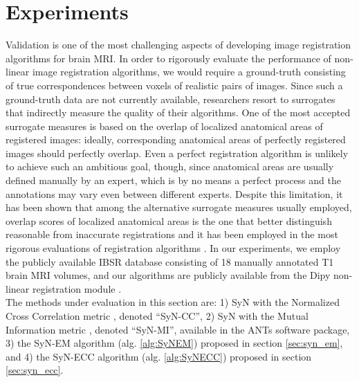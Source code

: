 \section{Experiments}
Validation is one of the most challenging aspects of developing image registration algorithms for brain MRI. In order to rigorously evaluate the performance of non-linear
image registration algorithms, we would require a ground-truth consisting of true correspondences between voxels of realistic pairs of images. Since such a ground-truth data are not currently available, researchers resort to surrogates that indirectly measure the quality of their algorithms. One of the most accepted surrogate measures is based
on the overlap of localized anatomical areas of registered images: ideally, corresponding anatomical areas of perfectly registered images should perfectly
overlap. Even a perfect registration algorithm is unlikely to achieve such an ambitious goal, though, since anatomical areas are usually defined manually by an expert, which is
by no means a perfect process and the annotations may vary even between different experts. Despite this limitation, it has been shown that among the alternative surrogate measures
usually employed, overlap scores of localized anatomical areas is the one that better distinguish reasonable from inaccurate registrations \citep{Rohlfing2012} and it has been employed in the most rigorous evaluations of registration algorithms \citep{Klein2009, Klein2010, Rohlfing2012}. In our experiments, we employ the publicly available IBSR database consisting of 18 manually annotated T1 brain MRI volumes, and our algorithms are publicly available from the Dipy non-linear registration module \citep{Garyfallidis2014}.\\

The methods under evaluation in this section are: 1) SyN with the Normalized Cross Correlation metric \citep{Avants2008}, denoted ``SyN-CC'', 2) SyN with the Mutual Information metric \citep{Mattes2003}, denoted ``SyN-MI'', available in the ANTs software package, 3) the SyN-EM algorithm (alg. \ref{alg:SyNEM}) proposed in section \ref{sec:syn_em}, and
4) the SyN-ECC algorithm (alg. \ref{alg:SyNECC}) proposed in section \ref{sec:syn_ecc}.

